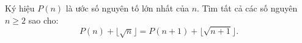\ifshowproblem
\begin{problem}[\gls{BW 2015}/P16]\label{example:BW-2015-P16}
    Ký hiệu \( P(n) \) là ước số nguyên tố lớn nhất của \( n \).  
    Tìm tất cả các số nguyên \( n \geq 2 \) sao cho:
    \[
        P(n) + \lfloor \sqrt{n} \rfloor = P(n+1) + \lfloor \sqrt{n+1} \rfloor.
    \]
\end{problem}
\fi

\footnotemark
{}
\fi